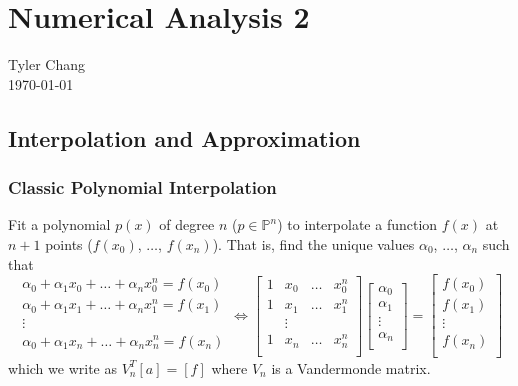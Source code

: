 \documentclass[12pt]{article}
\begin{document}
\section*{Numerical Analysis 2}
Tyler Chang\\
\today

\subsection*{Interpolation and Approximation}

\subsubsection*{Classic Polynomial Interpolation}

Fit a polynomial $p(x)$ of degree $n$ ($p \in \mathbb{P}^n$) to interpolate a 
function $f(x)$ at $n+1$ points ($f(x_0)$, $\ldots$, $f(x_n)$).
That is, find the unique values $\alpha_0$, $\ldots$, $\alpha_n$ such that
$$
\begin{array}{c}
\alpha_0 + \alpha_1 x_0 + \ldots + \alpha_n x_0^n = f(x_0)\\
\alpha_0 + \alpha_1 x_1 + \ldots + \alpha_n x_1^n = f(x_1)\\
\vdots\\
\alpha_0 + \alpha_1 x_n + \ldots + \alpha_n x_n^n = f(x_n)\\
\end{array} \iff
\left[\begin{array}{cccc}
1 & x_0 & \ldots & x_0^n\\
1 & x_1 & \ldots & x_1^n\\
&\vdots&&\\
1 & x_n & \ldots & x_n^n\\
\end{array}\right]
\left[\begin{array}{c}
\alpha_0\\
\alpha_1\\
\vdots\\
\alpha_n\\
\end{array}\right]
=
\left[\begin{array}{c}
f(x_0)\\
f(x_1)\\
\vdots\\
f(x_n)\\
\end{array}\right]
$$
which we write as $V_n^T [a] = [f]$ where $V_n$ is a Vandermonde matrix.
\end{document}
